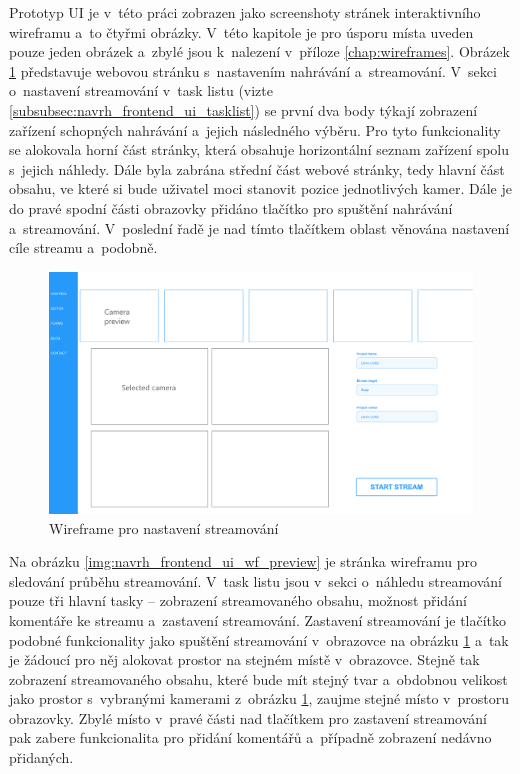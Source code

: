 \documentclass[thesis=M,czech]{FITthesis}[2012/06/26]
\begin{document}
	Prototyp UI je v~této práci zobrazen jako screenshoty stránek interaktivního wireframu a~to čtyřmi obrázky. V~této kapitole je pro úsporu místa uveden pouze jeden obrázek a~zbylé jsou k~nalezení v~příloze \ref{chap:wireframes}. Obrázek \ref{img:navrh_frontend_ui_wf_config} představuje webovou stránku s~nastavením nahrávání a~streamování. V~sekci o~nastavení streamování v~task listu (vizte \ref{subsubsec:navrh_frontend_ui_tasklist}) se první dva body týkají zobrazení zařízení schopných nahrávání a~jejich následného výběru. Pro tyto funkcionality se alokovala horní část stránky, která obsahuje horizontální seznam zařízení spolu s~jejich náhledy. Dále byla zabrána střední část webové stránky, tedy hlavní část obsahu, ve které si bude uživatel moci stanovit pozice jednotlivých kamer. Dále je do pravé spodní části obrazovky přidáno tlačítko pro spuštění nahrávání a~streamování. V~poslední řadě je nad tímto tlačítkem oblast věnována nastavení cíle streamu a~podobně.
\\
\begin{figure}[h]\centering
	\includegraphics[width=1\paperwidth, angle=90]{images/ui_wf_ulab-config.eps}
	\caption{Wireframe pro nastavení streamování}\label{img:navrh_frontend_ui_wf_config}
\end{figure}

Na obrázku \ref{img:navrh_frontend_ui_wf_preview} je stránka wireframu pro sledování průběhu streamování. V~task listu jsou v~sekci o~náhledu streamování pouze tři hlavní tasky -- zobrazení streamovaného obsahu, možnost přidání komentáře ke streamu a~zastavení streamování. Zastavení streamování je tlačítko podobné funkcionality jako spuštění streamování v~obrazovce na obrázku \ref{img:navrh_frontend_ui_wf_config} a~tak je žádoucí pro něj alokovat prostor na stejném místě v~obrazovce. Stejně tak zobrazení streamovaného obsahu, které bude mít stejný tvar a~obdobnou velikost jako prostor s~vybranými kamerami z~obrázku \ref{img:navrh_frontend_ui_wf_config}, zaujme stejné místo v~prostoru obrazovky. Zbylé místo v~pravé části nad tlačítkem pro zastavení streamování pak zabere funkcionalita pro přidání komentářů a~případně zobrazení nedávno přidaných. 
\end{document}
